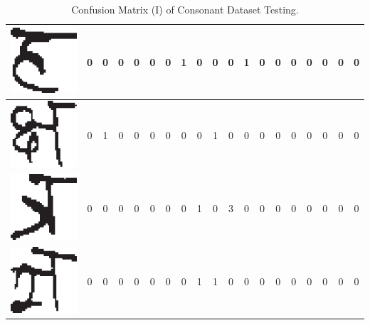 \begin{table}[h]
\begin{tabular}{|c|c|c|c|c|c|c|c|c|c|c|c|c|c|c|c|c|c|c|}
\hline
\includegraphics[scale=0.25]{figures/datasets/nhcr/consonants/33ha} & 0 & 0 & 0 & 0 & 0 & 0 & 1 & 0 & 0 & 0 & 1 & 0 & 0 & 0 & 0 & 0 & 0 & 0\tabularnewline
\hline
\includegraphics[scale=0.25]{figures/datasets/nhcr/consonants/34kchya} & 0 & 1 & 0 & 0 & 0 & 0 & 0 & 0 & 1 & 0 & 0 & 0 & 0 & 0 & 0 & 0 & 0 & 0\tabularnewline
\hline
\includegraphics[scale=0.25]{figures/datasets/nhcr/consonants/35tra} & 0 & 0 & 0 & 0 & 0 & 0 & 0 & 1 & 0 & 3 & 0 & 0 & 0 & 0 & 0 & 0 & 0 & 0\tabularnewline
\hline
\includegraphics[scale=0.25]{figures/datasets/nhcr/consonants/36gya} & 0 & 0 & 0 & 0 & 0 & 0 & 0 & 1 & 1 & 0 & 0 & 0 & 0 & 0 & 0 & 0 & 0 & 0\tabularnewline
\hline
\end{tabular}
\caption{Confusion Matrix (I) of Consonant Dataset Testing.}
\label{table_consonant_cm1}
\end{table}

